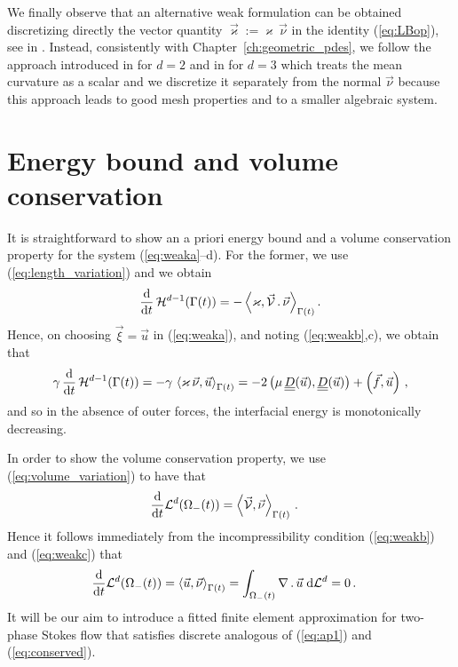 We finally observe that an alternative weak formulation can be obtained
discretizing directly the vector quantity $\vec\varkappa:=\varkappa\,\vec\nu$
in the identity (\ref{eq:LBop}), see in \cite{Dziuk91,Bansch01,GanesanMT07}.
Instead, consistently with Chapter~\ref{ch:geometric_pdes}, we follow the
approach introduced in \cite{triplej} for $d=2$ and in \cite{gflows3d} for
$d=3$ which treats the mean curvature as a scalar and we discretize it
separately from the normal $\vec\nu$ because this approach leads to good mesh
properties and to a smaller algebraic system.

\section{Energy bound and volume conservation}\label{sec:stokes_energy}
It is straightforward to show an a priori energy bound and a volume
conservation property for the system (\ref{eq:weaka}--d). For the former, we
use (\ref{eq:length_variation}) and we obtain
\begin{equation}\label{eq:dtarea}
\frac{\rm d}{{\rm d}t}\,\mathcal{H}^{d-1}(\Gamma(t)) = -
\left\langle \varkappa,\vec{\mathcal{V}}\,.\,\vec\nu\right\rangle_{\Gamma(t)}.
\end{equation}
Hence, on choosing $\vec\xi = \vec u$ in (\ref{eq:weaka}), and noting
(\ref{eq:weakb},c), we obtain that
\begin{align}
\gamma\, \ddt\,\surfvol(\Gamma(t)) = -
\gamma\,\left\langle \varkappa\,\vec\nu, \vec u\right\rangle_{\Gamma(t)}
=  - 2\left(\mu\,\mat D(\vec u), \mat D(\vec u)\right) +
\left(\vec f, \vec u\right) \,,
\label{eq:ap1}
\end{align}
and so in the absence of outer forces, the interfacial energy is monotonically
decreasing.

In order to show the volume conservation property, we use
(\ref{eq:volume_variation}) to have that
\begin{align}
\frac{\rm d}{{\rm d}t} \mathcal{L}^d(\Omega_-(t)) & = \left\langle \vec{\mathcal{V}}, \vec\nu
\right\rangle_{\Gamma(t)}\,.
\end{align}
Hence it follows immediately from the incompressibility condition
(\ref{eq:weakb}) and (\ref{eq:weakc}) that
\begin{align}
\frac{\rm d}{{\rm d}t} \mathcal{L}^d(\Omega_-(t)) & = \left\langle \vec u , \vec\nu
\right\rangle_{\Gamma(t)}
 = \int_{\Omega_-(t)} \nabla\,.\,\vec u \;{\rm d}{\cal L}^{d} =0\,. \label{eq:conserved}
\end{align}
It will be our aim to introduce a fitted finite element approximation for
two-phase Stokes flow that satisfies discrete analogous of
(\ref{eq:ap1}) and (\ref{eq:conserved}).

